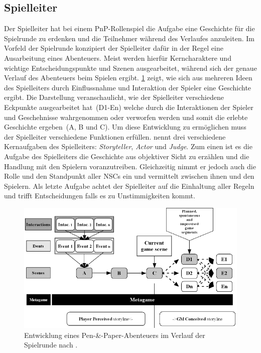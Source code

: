 \subsection{Spielleiter}
\label{sec:Spielleiter}
Der Spielleiter hat bei einem PnP-Rollenspiel die Aufgabe eine Geschichte für die Spielrunde zu erdenken und die Teilnehmer während des Verlaufes anzuleiten. Im Vorfeld der Spielrunde konzipiert der Spielleiter dafür in der Regel eine Ausarbeitung eines Abenteuers. Meist werden hierfür Kerncharaktere und wichtige Entscheidungspunkte und Szenen ausgearbeitet, während sich der genaue Verlauf des Abenteuers beim Spielen ergibt. \ref{fig:storyflow_pnp} zeigt, wie sich aus mehreren Ideen des Spielleiters durch Einflussnahme und Interaktion der Spieler eine Geschichte ergibt. Die Darstellung veranschaulicht, wie der Spielleiter verschiedene Eckpunkte ausgearbeitet hat~(D1-En) welche durch die Interaktionen der Spieler und Geschehnisse wahrgenommen oder verworfen werden und somit die erlebte Geschichte ergeben~(A, B und C). Um diese Entwicklung zu ermöglichen muss der Spielleiter verschiedene Funktionen erfüllen.\newline
\cite{Arinbjarnar} nennt drei verschiedene Kernaufgaben des Spielleiters: \emph{Storyteller}, \emph{Actor} und \emph{Judge}. Zum einen ist es die Aufgabe des Spielleiters die Geschichte aus objektiver Sicht zu erzählen und die Handlung mit den Spielern voranzutreiben. Gleichzeitig nimmt er jedoch auch die Rolle und den Standpunkt aller NSCs ein und vermittelt zwischen ihnen und den Spielern. Als letzte Aufgabe achtet der Spielleiter auf die Einhaltung aller Regeln und trifft Entscheidungen falls es zu Unstimmigkeiten kommt.
\begin{figure}
	\centering
		\includegraphics[width=1.00\textwidth]{media/storyflow_pnp.png}
	\caption{Entwicklung eines Pen-\&-Paper-Abenteuers im Verlauf der Spielrunde nach \cite{Tychsen2006a}.}
	\label{fig:storyflow_pnp}
\end{figure}


